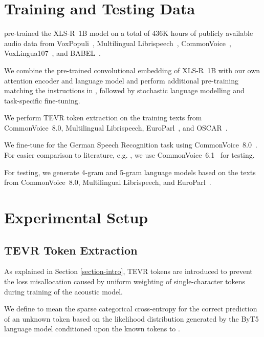 \documentclass{article} \usepackage{iclr2022_conference,times}
\begin{document}
\section{Training and Testing Data}

\citet{xlsr_1B_2021} pre-trained the XLS-R~1B model on a total of 436K hours of publicly available audio data from VoxPopuli~\citep{voxpopuli}, Multilingual Librispeech~\citep{mls}, CommonVoice~\citep{commonvoice}, VoxLingua107~\citep{voxlingua107}, and BABEL~\citep{babel}.

We combine the pre-trained convolutional embedding of XLS-R~1B with our own attention encoder and language model and perform additional pre-training matching the instructions in \citet{xlsr_1B_2021}, followed by stochastic language modelling and task-specific fine-tuning.

We perform TEVR token extraction on the training texts from CommonVoice~8.0, Multilingual Librispeech, EuroParl~\citep{eparl}, and OSCAR~\citep{oscar1,oscar2}.

We fine-tune for the German Speech Recognition task using CommonVoice~8.0~\citep{commonvoice}. For easier comparison to literature, e.g. \citet{scribosermo}, we use CommonVoice~6.1~\citep{commonvoice} for testing.

For testing, we generate 4-gram and 5-gram language models based on the texts from CommonVoice~8.0, Multilingual Librispeech, and EuroParl~\citep{eparl}. 

\section{Experimental Setup}

\subsection{TEVR Token Extraction}
\label{section-tevr}

As explained in Section \ref{section-intro}, TEVR tokens are introduced to prevent the loss misallocation caused by uniform weighting of single-character tokens during training of the acoustic model. 







We define  to mean the sparse categorical cross-entropy for the correct prediction of an unknown token  based on the likelihood distribution generated by the ByT5 language model conditioned upon the known tokens  to . 
\end{document}

